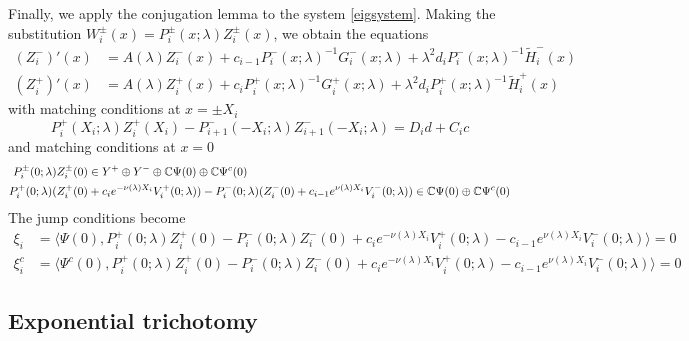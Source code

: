 \documentclass[10pt,reqno]{amsart}
\theoremstyle{plain}
\theoremstyle{definition}
\theoremstyle{remark}
\numberwithin{theorem}{section}
\numberwithin{equation}{section}
\begin{document}
Finally, we apply the conjugation lemma to the system \cref{eigsystem}. Making the substitution $W_i^\pm(x) = P_i^\pm(x; \lambda) Z_i^\pm(x)$, we obtain the equations
\begin{equation}\label{systemZ}
\begin{aligned}
(Z_i^-)'(x) &= A(\lambda) Z_i^-(x) + c_{i-1} P_i^-(x; \lambda)^{-1} G_i^-(x; \lambda) + \lambda^2 d_i P_i^-(x; \lambda)^{-1} \tilde{H}_i^-(x) \\
(Z_i^+)'(x) &= A(\lambda) Z_i^+(x) + c_i P_i^+(x; \lambda)^{-1} G_i^+(x; \lambda) + \lambda^2 d_i P_i^+(x; \lambda)^{-1} \tilde{H}_i^+(x)
\end{aligned}
\end{equation}
with matching conditions at $x = \pm X_i$
\begin{equation}\label{systemmiddle}
P_i^+(X_i; \lambda) Z_i^+(X_i) - P_{i+1}^-(-X_i; \lambda) Z_{i+1}^-(-X_i; \lambda) = D_i d + C_i c 
\end{equation}
and matching conditions at $x = 0$
\begin{equation}\label{systemcenter}
\begin{aligned}
P_i^\pm(0; \lambda) Z_i^\pm(0) &\in Y^+ \oplus Y^- \oplus \mathbb{C} \Psi(0) \oplus \mathbb{C} \Psi^c(0) \\
P_i^+(0; \lambda)(Z_i^+(0) &+ c_i e^{-\nu(\lambda)X_i}V_i^+(0; \lambda)) - P_i^-(0; \lambda) (Z_i^-(0) + c_{i-1} e^{\nu(\lambda)X_i} V_i^-(0; \lambda)) \in \mathbb{C} \Psi(0) \oplus \mathbb{C} \Psi^c(0)
\end{aligned}
\end{equation}
The jump conditions become
\begin{equation}\label{jumpcondZ}
\begin{aligned}
\xi_i &= \langle \Psi(0), P_i^+(0; \lambda) Z_i^+(0) - P_i^-(0; \lambda) Z_i^-(0) + c_i e^{-\nu(\lambda)X_i}V_i^+(0; \lambda) - c_{i-1} e^{\nu(\lambda)X_i} V_i^-(0; \lambda) \rangle = 0  \\
\xi_i^c &= \langle \Psi^c(0), P_i^+(0; \lambda) Z_i^+(0) - P_i^-(0; \lambda) Z_i^-(0) + c_i e^{-\nu(\lambda)X_i}V_i^+(0; \lambda) - c_{i-1} e^{\nu(\lambda)X_i} V_i^-(0; \lambda) \rangle = 0 
\end{aligned}
\end{equation}

\subsection{Exponential trichotomy}\label{sec:trichotomy}
\end{document}
